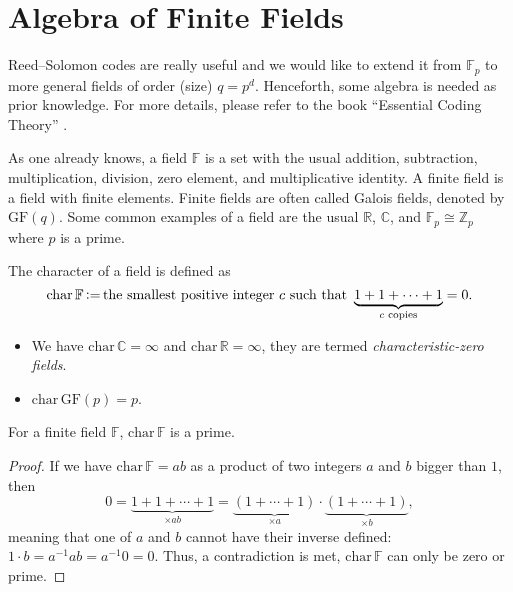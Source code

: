 \section{Algebra of Finite Fields}

Reed--Solomon codes are really useful and we would like to extend it from $\mathbb{F}_p$ to more general fields of order (size) $q=p^d$. Henceforth, some algebra is needed as prior knowledge. For more details, please refer to the book ``Essential Coding Theory'' \cite{Essential_Coding_Theory}.

As one already knows, a field $\mathbb{F}$ is a set with the usual addition, subtraction, multiplication, division, zero element, and multiplicative identity. A finite field is a field with finite elements. Finite fields are often called Galois fields, denoted by $\mathrm{GF}(q)$. Some common examples of a field are the usual $\mathbb{R}$, $\mathbb{C}$, and $\mathbb{F}_p \cong \mathbb{Z}_p$ where $p$ is a prime.

\begin{definition}[Character]
    The character of a field is defined as
    \begin{equation}
        \mathrm{char}\,\mathbb{F}\operatorname{\vcentcolon=} \text{the smallest positive integer $c$ such that }\underbrace{1+1+\cdots+1}_{c\text{ copies}}=0.
    \end{equation}
\end{definition}
\begin{example}
    \begin{itemize}
        \item We have $\mathrm{char}\,\mathbb{C} = \infty$ and $\mathrm{char}\,\mathbb{R}=\infty$, they are termed \textit{characteristic-zero fields}.
        \item $\mathrm{char}\,\mathrm{GF}(p)=p$.
    \end{itemize}
\end{example}

\begin{theorem}
    For a finite field $\mathbb{F}$, $\mathrm{char}\,\mathbb{F}$ is a prime.
\end{theorem}
\begin{proof}
    If we have $\mathrm{char}\,\mathbb{F}=ab$ as a product of two integers $a$ and $b$ bigger than $1$, then
    \begin{equation*}
        0 = \underbrace{1+1+\cdots+1}_{\times ab} = \underbrace{(1+\cdots+1)}_{\times a} \cdot \underbrace{(1+\cdots+1)}_{\times b},
    \end{equation*}
    meaning that one of $a$ and $b$ cannot have their inverse defined: $1\cdot b = a^{-1} a b = a^{-1}0 = 0$. Thus, a contradiction is met, $\mathrm{char}\,\mathbb{F}$ can only be zero or prime.
\end{proof}

